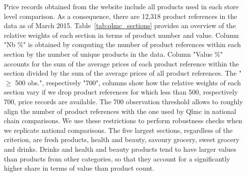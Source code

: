 \documentclass[english]{article}
\begin{document}
Price records obtained from the website include all products used in each store level comparison. As a consequence, there are 12,318 product references in the data as of March 2015. Table~\ref{tab:qlmc_sections} provides an overview of the relative weights of each section in terms of product number and value. Column "Nb \%" is obtained by computing the number of product references within each section by the number of unique products in the data. Column "Value \%" accounts for the sum of the average prices of each product reference within the section divided by the sum of the average prices of all product references. The "$\ge$ 500 obs.", respectively "700", columns show how the relative weights of each section vary if we drop product references for which less than 500, respectively 700, price records are available. The 700 observation threshold allows to roughly align the number of product references with the one used by Qlmc in national chain comparisons. We use these restrictions to perform robustness checks when we replicate national comparisons. The five largest sections, regardless of the criterion, are fresh products, health and beauty, savoury grocery, sweet grocery and drinks. Drinks and health and beauty products tend to have larger values than products from other categories, so that they account for a significantly higher share in terms of value than product count.
\end{document}
